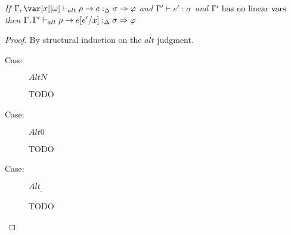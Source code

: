 \begin{sublemma}
\emph{If $\G, \xo \vdash_{alt} \rho \to e :_\Delta \s \Rightarrow \vp$ and $\Gamma' \vdash e' : \sigma$ and
    $\Gamma' ~\textrm{has no linear vars}$ then $\Gamma, \Gamma' \vdash_{alt} \rho \to e[e'/x] :_\Delta \sigma \Rightarrow \varphi$}
\end{sublemma}

\begin{proof}
By structural induction on the $alt$ judgment.

\begin{description}
\item[Case:] $AltN$
\begin{tabbing}
    TODO
\end{tabbing}

\item[Case:] $Alt0$
\begin{tabbing}
    TODO
\end{tabbing}

\item[Case:] $Alt_\_$
\begin{tabbing}
    TODO
\end{tabbing}

\end{description}
\end{proof}
